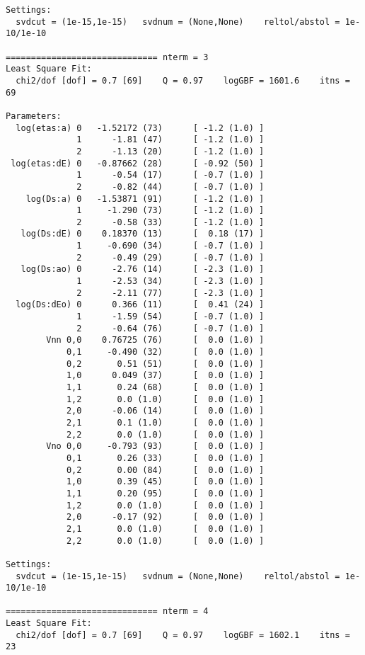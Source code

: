 \documentclass[letterpaper,10pt,english]{sphinxmanual}
\begin{document}
\begin{Verbatim}[commandchars=\\\{\}]
Settings:
  svdcut = (1e-15,1e-15)   svdnum = (None,None)    reltol/abstol = 1e-10/1e-10

============================== nterm = 3
Least Square Fit:
  chi2/dof [dof] = 0.7 [69]    Q = 0.97    logGBF = 1601.6    itns = 69

Parameters:
  log(etas:a) 0   -1.52172 (73)      [ -1.2 (1.0) ]
              1      -1.81 (47)      [ -1.2 (1.0) ]
              2      -1.13 (20)      [ -1.2 (1.0) ]
 log(etas:dE) 0   -0.87662 (28)      [ -0.92 (50) ]
              1      -0.54 (17)      [ -0.7 (1.0) ]
              2      -0.82 (44)      [ -0.7 (1.0) ]
    log(Ds:a) 0   -1.53871 (91)      [ -1.2 (1.0) ]
              1     -1.290 (73)      [ -1.2 (1.0) ]
              2      -0.58 (33)      [ -1.2 (1.0) ]
   log(Ds:dE) 0    0.18370 (13)      [  0.18 (17) ]
              1     -0.690 (34)      [ -0.7 (1.0) ]
              2      -0.49 (29)      [ -0.7 (1.0) ]
   log(Ds:ao) 0      -2.76 (14)      [ -2.3 (1.0) ]
              1      -2.53 (34)      [ -2.3 (1.0) ]
              2      -2.11 (77)      [ -2.3 (1.0) ]
  log(Ds:dEo) 0      0.366 (11)      [  0.41 (24) ]
              1      -1.59 (54)      [ -0.7 (1.0) ]
              2      -0.64 (76)      [ -0.7 (1.0) ]
        Vnn 0,0    0.76725 (76)      [  0.0 (1.0) ]
            0,1     -0.490 (32)      [  0.0 (1.0) ]
            0,2       0.51 (51)      [  0.0 (1.0) ]
            1,0      0.049 (37)      [  0.0 (1.0) ]
            1,1       0.24 (68)      [  0.0 (1.0) ]
            1,2       0.0 (1.0)      [  0.0 (1.0) ]
            2,0      -0.06 (14)      [  0.0 (1.0) ]
            2,1       0.1 (1.0)      [  0.0 (1.0) ]
            2,2       0.0 (1.0)      [  0.0 (1.0) ]
        Vno 0,0     -0.793 (93)      [  0.0 (1.0) ]
            0,1       0.26 (33)      [  0.0 (1.0) ]
            0,2       0.00 (84)      [  0.0 (1.0) ]
            1,0       0.39 (45)      [  0.0 (1.0) ]
            1,1       0.20 (95)      [  0.0 (1.0) ]
            1,2       0.0 (1.0)      [  0.0 (1.0) ]
            2,0      -0.17 (92)      [  0.0 (1.0) ]
            2,1       0.0 (1.0)      [  0.0 (1.0) ]
            2,2       0.0 (1.0)      [  0.0 (1.0) ]

Settings:
  svdcut = (1e-15,1e-15)   svdnum = (None,None)    reltol/abstol = 1e-10/1e-10

============================== nterm = 4
Least Square Fit:
  chi2/dof [dof] = 0.7 [69]    Q = 0.97    logGBF = 1602.1    itns = 23


\end{Verbatim}
\end{document}

